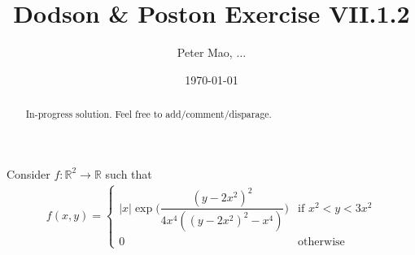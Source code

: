 \documentclass[11pt]{article}
\title{Dodson \& Poston Exercise VII.1.2}
\author{Peter Mao, $\ldots$}
\date{\today}
\begin{document}
\maketitle
\pagestyle{empty}

\begin{abstract}
  In-progress solution.  Feel free to add/comment/disparage.
\end{abstract}


Consider $f\colon \mathbb{R}^2 \to \mathbb{R}$ such that
\begin{align*}
  f(x,y) = 
  \begin{cases}
    |x| \exp  \bigg(
    \dfrac{(y - 2x^2)^2}
          {4x^4((y - 2x^2)^2 - x^4)}
          \bigg) &  \text{if $x^2 < y < 3x^2$} \\
    0 &\text{otherwise}
  \end{cases}
\end{align*}
\end{document}
